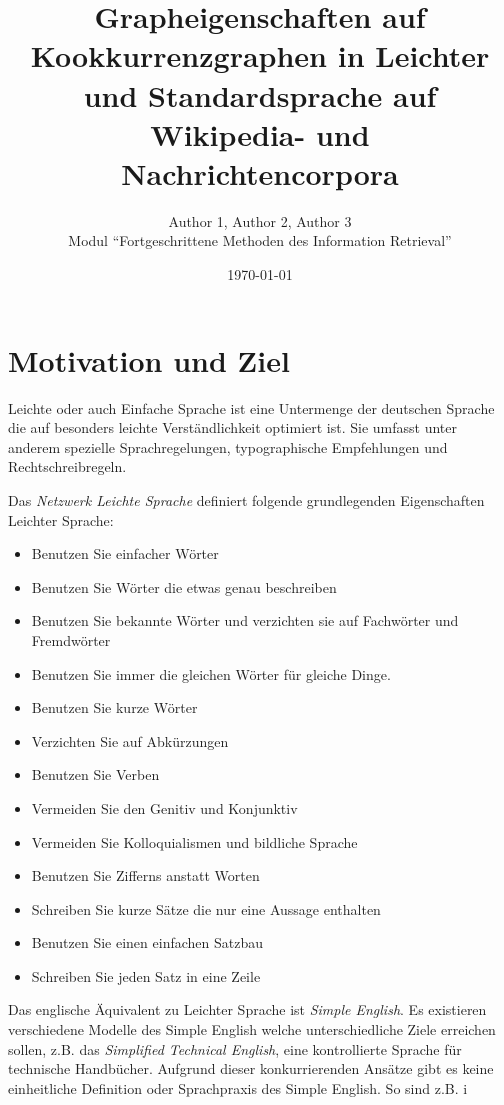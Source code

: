 \documentclass[12pt, a4paper]{article}
\title{Grapheigenschaften auf Kookkurrenzgraphen in Leichter und Standardsprache auf Wikipedia- und Nachrichtencorpora}
\author{Author 1, Author 2, Author 3\\Modul "`Fortgeschrittene Methoden des Information Retrieval"'}
\date{\today}
\begin{document}
\maketitle
\tableofcontents

\section{Motivation und Ziel}

Leichte oder auch Einfache Sprache ist eine Untermenge der deutschen Sprache
die auf besonders leichte Verst\"andlichkeit optimiert ist. Sie umfasst unter
anderem spezielle Sprachregelungen, typographische Empfehlungen und
Rechtschreibregeln. 

Das \emph{Netzwerk Leichte Sprache} definiert folgende grundlegenden
Eigenschaften Leichter Sprache:

\begin{itemize}
	\item Benutzen Sie einfacher W\"orter
	\item Benutzen Sie W\"orter die etwas genau beschreiben
	\item Benutzen Sie bekannte W\"orter und verzichten sie auf Fachw\"orter und Fremdw\"orter
	\item Benutzen Sie immer die gleichen W\"orter f\"ur gleiche Dinge.
	\item Benutzen Sie kurze W\"orter
	\item Verzichten Sie auf Abk\"urzungen
	\item Benutzen Sie Verben
	\item Vermeiden Sie den Genitiv und Konjunktiv
	\item Vermeiden Sie Kolloquialismen und bildliche Sprache
	\item Benutzen Sie Zifferns anstatt Worten
	\item Schreiben Sie kurze S\"atze die nur eine Aussage enthalten
	\item Benutzen Sie einen einfachen Satzbau
	\item Schreiben Sie jeden Satz in eine Zeile
\end{itemize}

Das englische \"Aquivalent zu Leichter Sprache ist \emph{Simple English}. Es
existieren verschiedene Modelle des Simple English welche unterschiedliche
Ziele erreichen sollen, z.B. das \emph{Simplified Technical English}, eine
kontrollierte Sprache f\"ur technische Handb\"ucher. Aufgrund dieser
konkurrierenden Ans\"atze gibt es keine einheitliche Definition oder
Sprachpraxis des Simple English. So sind z.B. i
\end{document}
